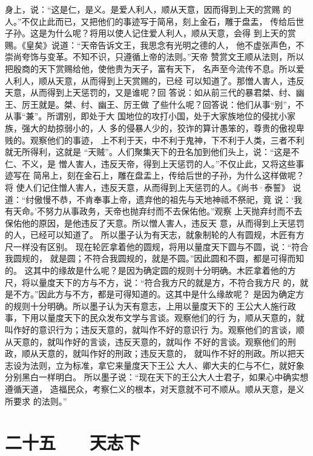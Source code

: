 \documentclass[12pt,UTF8]{ctexbook}
\begin{document}
身上，说：“这是仁，是义。是爱人利人，顺从天意，因而得到上天的赏赐 
的人。”不仅止此而已，又把他们的事迹写于简帛，刻上金石，雕于盘盂， 
传给后世子孙。这是为什么呢？将用以使人记住爱人利人，顺从天意，会得 
到上天的赏赐。《皇矣》说道：“天帝告诉文王，我思念有光明之德的人， 
他不虚张声色，不崇尚夸饰与变革。不知不识，只遵循上帝的法则。”天帝 
赞赏文王顺从法则，所以把殷商的天下赏赐给他，使他贵为天子，富有天下， 
名声至今流传不息。所以爱人利人，顺从天意，从而得到上天赏赐的，已经 
可以知道了。那憎人害人，违反天意，从而得到上天惩罚的，又是谁呢？回 
答说：如从前三代的暴君桀、纣、幽王、厉王就是。桀、纣、幽王、厉王做 
了些什么呢？回答说：他们从事“别”，不从事“兼”。所谓别，即处于大 
国地位的攻打小国，处于大家族地位的侵扰小家族，强大的劫掠弱小的，人 
多的侵暴人少的，狡诈的算计愚笨的，尊贵的傲视卑贱的。观察他们的事迹， 
上不利于天，中不利于鬼神，下不利于人类，三者不利就无所得利，这就是 
“天贼”。人们聚集天下的丑名加到他们头上，说：“这是不仁、不义，是 
憎人害人，违反天帝，得到上天惩罚的人。”不仅止此，又将这些事迹写在 
简帛上，刻在金石上，雕在盘盂上，传给后世的子孙，为什么这样做呢？将 
使人们记住憎人害人，违反天意，从而得到上天惩罚的人。《尚书·泰誓》 
说道：“纣傲慢不恭，不肯奉事上帝，遗弃他的祖先与天地神祗不祭祀，竟 
说：‘我有天命。’不努力从事政务，天帝也抛弃纣而不去保佑他。”观察 
上天抛弃纣而不去保佑他的原因，是他违反了天意。所以憎人害人，违反天 
意，从而得到上天惩罚的人，已经可以知道了。 
所以墨子认为有天志，就象制轮的人有圆规，木匠有方尺一样没有区别。 
现在轮匠拿着他的圆规，将用以量度天下圆与不圆，说：“符合我圆规的， 
就是圆；不符合我圆规的，就是不圆。”因此圆和不圆，都是可得而知的。 
这其中的缘故是什么呢？是因为确定圆的规则十分明确。木匠拿着他的方 
尺，将以量度天下的方与不方，说：“符合我方尺的就是方，不符合我方尺 
的，就是不方。”因此方与不方，都是可得知道的。这其中是什么缘故呢？ 
是因为确定方的规则十分明确。所以墨子认为天有意志，上用以量度天下的 
王公大人施行政事，下用以量度天下的民众发布文学与言谈。观察他们的行 
为，顺从天意的，就叫作好的意识行为；违反天意的，就叫作不好的意识行 
为。观察他们的言谈，顺从天意的，就叫作好的言谈，违反天意的，就叫作 
不好的言谈。观察他们的刑政，顺从天意的，就叫作好的刑政；违反天意的， 
就叫作不好的刑政。所以把天志设为法则，立为标准，拿它来量度天下王公 
大人、卿大夫的仁与不仁，就好象分别黑白一样明白。 
所以墨子说：“现在天下的王公大人士君子，如果心中确实想遵循天道， 
造福民众，考察仁义的根本，对天意就不可不顺从。顺从天意，是义所要求 
的法则。” 

\chapter{二十五　　天志下}
\end{document}

